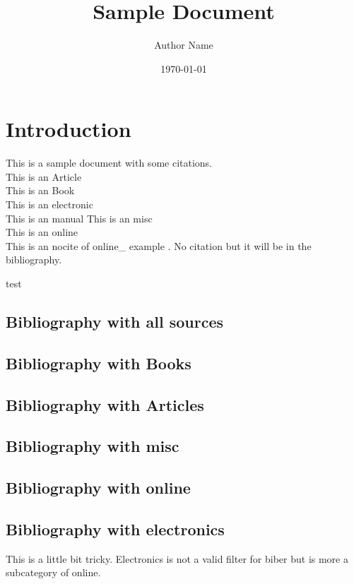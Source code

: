 \documentclass{article}
\title{Sample Document}
\author{Author Name}
\date{\today}
\begin{document}
\section{Introduction}
This is a sample document with some citations. \\
This is an Article \cite{ArticleSource}\\
This is an Book \cite{example_Book}\\
This is an electronic \cite{example} \\
This is an manual \cite{Ch340_1D}
This is an misc \cite{MiscKey} \\
This is an online \cite{WinNT}\\

This is an nocite of online\_ example \nocite{online_example}. No citation but it will be in the bibliography.

test \cite{Siemens_OPCUA_Def}

\printbibliography[
heading=bibintoc,
title={Whole bibliography}
]

\newpage
\subsection{Bibliography with all sources}
\printbibliography[title={All sources}]

\subsection{Bibliography with Books}
\printbibliography[title={Books}, type=book]

\subsection{Bibliography with Articles}
\printbibliography[title={Articles}, type=article]

\subsection{Bibliography with misc}
\printbibliography[title={misc}, type=misc]

\subsection{Bibliography with online}
\printbibliography[title={online}, type=online]




\subsection{Bibliography with electronics}
This is a little bit tricky. Electronics is not a valid filter for biber but is more a subcategory of online. 
\end{document}

